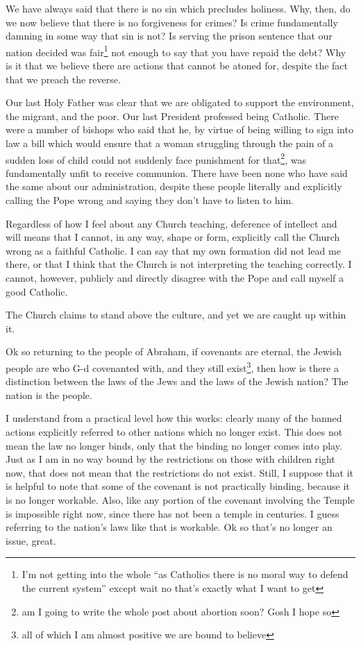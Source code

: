 \documentclass[12pt]{article}
\newcommand{\say}[1]{``#1''}
\renewcommand{\,}{\textsuperscript{,}}
\begin{document}
We have always said that there is no sin which precludes holiness.  
Why, then, do we now believe that there is no forgiveness for crimes?  
Is crime fundamentally damning in some way that sin is not?  
Is serving the prison sentence that our nation decided was fair\footnote{I'm not getting into the whole \say{as Catholics there is no moral way to defend the current system} except wait no that's exactly what I want to get} not enough to say that you have repaid the debt?  
Why is it that we believe there are actions that cannot be atoned for, despite the fact that we preach the reverse.

Our last Holy Father was clear that we are obligated to support the environment, the migrant, and the poor.  
Our last President professed being Catholic.  
There were a number of bishops who said that he, by virtue of being willing to sign into law a bill which would ensure that a woman struggling through the pain of a sudden loss of child could not suddenly face punishment for that\footnote{am I going to write the whole post about abortion soon? Gosh I hope so}, was fundamentally unfit to receive communion.  
There have been none who have said the same about our administration, despite these people literally and explicitly calling the Pope wrong and saying they don't have to listen to him.

Regardless of how I feel about any Church teaching, deference of intellect and will means that I cannot, in any way, shape or form, explicitly call the Church wrong as a faithful Catholic.  
I can say that my own formation did not lead me there, or that I think that the Church is not interpreting the teaching correctly.  
I cannot, however, publicly and directly disagree with the Pope and call myself a good Catholic.

The Church claims to stand above the culture, and yet we are caught up within it.

Ok so returning to the people of Abraham, if covenants are eternal, the Jewish people are who G-d covenanted with, and they still exist\footnote{all of which I am almost positive we are bound to believe}, then how is there a distinction between the laws of the Jews and the laws of the Jewish nation?  
The nation is the people.

I understand from a practical level how this works: clearly many of the banned actions explicitly referred to other nations which no longer exist.  
This does not mean the law no longer binds, only that the binding no longer comes into play.  
Just as I am in no way bound by the restrictions on those with children right now, that does not mean that the restrictions do not exist.  
Still, I suppose that it is helpful to note that some of the covenant is not practically binding, because it is no longer workable.  
Also, like any portion of the covenant involving the Temple is impossible right now, since there has not been a temple in centuries.  
I guess referring to the nation's laws like that is workable.  
Ok so that's no longer an issue, great.
\end{document}
